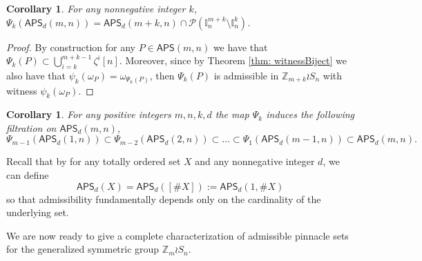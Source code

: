 \documentclass[12pt,reqno]{amsart}
\numberwithin{equation}{section}
\theoremstyle{plain}
\newtheorem{corollary}[theorem]{Corollary}
\theoremstyle{definition}
\theoremstyle{remark}
\newcommand{\Z}{\mathbb{Z}}
\newcommand{\I}{\mathbb{I}}
\newcommand\APS{\mathsf{APS}}
\begin{document}
\begin{corollary}\label{cor: APSimage}
For any nonnegative integer $k$, 
$\Psi_k(\APS_d(m,n)) =\APS_d(m+k,n) \cap \mathcal{P}(\I_n^{m+k}\setminus \I_n^{k})$. 
\end{corollary}


\begin{proof}
By construction for any $P \in \APS(m,n)$ we have that $\Psi_k(P) \subset \bigcup_{i=k}^{m+k-1} \zeta^i[n]$. Moreover, since by Theorem \ref{thm: witnessBiject} we also have that $\psi_{k}(\omega_P) = \omega_{\Psi_k(P)}$, then $\Psi_k(P)$ is admissible in $\Z_{m+k}\wr S_n$ with witness $\psi_{k}(\omega_P)$. 
\end{proof}




\begin{corollary} \label{cor: APSFiltrationM}
 For any positive integers $m,n,k,d$ the map $\Psi_k$ induces the following filtration on $\APS_d(m,n)$, 
 \[
\Psi_{m-1}(\APS_d(1, n)) \subset\Psi_{m-2}(\APS_d(2, n)) \subset \dots \subset\Psi_1(\APS_d(m-1, n)) \subset \APS_d(m, n).
\]
\end{corollary}

Recall that by \cite[Lemma 3.8]{PinSignedPermutations} for any totally ordered set $X$ and any nonnegative integer $d$, we can define
\begin{equation}\label{eq:APS=set}
\APS_d(X) = \APS_d([\#X]) := \APS_d(1,\#X)
\end{equation}
so that admissibility fundamentally depends only on the cardinality of the underlying set.

We are now ready to give a complete characterization of admissible pinnacle sets for the generalized symmetric group $\Z_m \wr S_n$.
\end{document}

